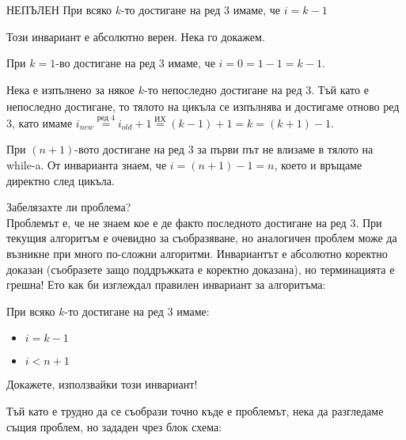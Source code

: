 \begin{boxinvariant*}{НЕПЪЛЕН}{}
	При всяко $k$-то достигане на ред 3 имаме, че $i=k-1$
\end{boxinvariant*}

\noindent
Този инвариант е абсолютно верен. Нека го докажем.

\begin{base}
	При $k=1$-во достигане на ред 3 имаме, че $i=0=1-1=k-1$.
\end{base}

\begin{maintenance}
	Нека е изпълнено за някое $k$-то $\underline{\text{непоследно}}$ достигане на ред 3. Тъй като е непоследно достигане, то тялото на цикъла се изпълнява и достигаме отново ред 3, като имаме $i_{new}\overset{\text{ред 4}}{=}i_{old}+1\overset{\text{ИХ}}{=}(k-1)+1=k=(k+1)-1$.
\end{maintenance}

\begin{termination}
	При $(n+1)$-вото достигане на ред 3 за първи път не влизаме в тялото на while-a. От инварианта знаем, че $i=(n+1)-1=n$, което и връщаме директно след цикъла.
\end{termination}

\leavevmode\newline\noindent
Забелязахте ли проблема?\\
\leavevmode\newline\noindent
Проблемът е, че не знаем кое е де факто $\textbf{последното}$ достигане на ред 3. При текущия алгоритъм е очевидно за съобразяване, но аналогичен проблем може да възникне при много по-сложни алгоритми. Инвариантът е абсолютно коректно доказан (съобразете защо поддръжката е коректно доказана), но терминацията е грешна! Ето как би изглеждал правилен инвариант за алгоритъма:

\begin{boxinvariant*}{}{}
	При всяко $k$-то достигане на ред 3 имаме:
	\begin{itemize}
		\item $i=k-1$
		\item $i<n+1$
	\end{itemize}
\end{boxinvariant*}

\noindent
Докажете, използвайки този инвариант!

\leavevmode\newline

\noindent
Тъй като е трудно да се съобрази точно къде е проблемът, нека да разгледаме същия проблем, но зададен чрез блок схема:

